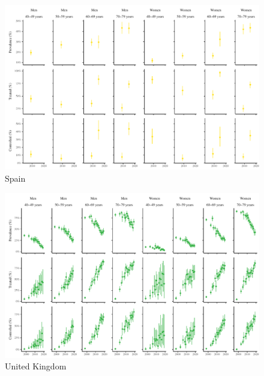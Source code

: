 \documentclass[12pt]{article}
\begin{document}
\begin{appendix}
\begin{landscape}
        \begin{figure}[H]
            \centering
            \includegraphics[width=\linewidth]{../3_figures/countries/fig_spain.pdf}
            \caption{Spain}
            \label{fig:spain}
        \end{figure}

        \begin{figure}[H]
            \centering
            \includegraphics[width=\linewidth]{../3_figures/countries/fig_united kingdom.pdf}
            \caption{United Kingdom}
            \label{fig:uk}
        \end{figure}


\end{landscape}
\end{appendix}
\end{document}
